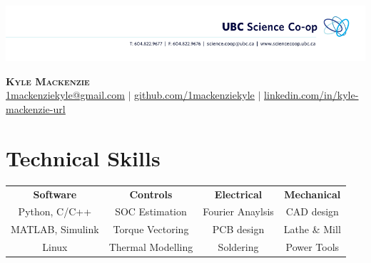 \documentclass[letterpaper,11pt]{article}
\begin{document}

\begin{center}
\vspace*{-1.5cm}
    \centerline{\includegraphics[width=\paperwidth]{head}}
    \textbf{\Huge \scshape Kyle Mackenzie} \\ \vspace{1pt}
    \href{mailto:1mackenziekyle@gmail.com}{\underline{1mackenziekyle@gmail.com}} $|$
    \small \href{https://github.com/1mackenziekyle}{\underline{github.com/1mackenziekyle}} $|$
    \href{https://www.linkedin.com/in/kyle-mackenzie-url/}{\underline{linkedin.com/in/kyle-mackenzie-url}}  
    
    
\end{center}

 
  
%
\section{Technical Skills}
\begin{center}
    \begin{tabular*}{\textwidth}{@{\extracolsep{\fill}}cccc}
        \textbf{Software} & \textbf{Controls} & \textbf{Electrical} & \textbf{Mechanical} \\
        Python, C/C++ & SOC Estimation & Fourier Anaylsis & CAD design \\
        MATLAB, Simulink & Torque Vectoring & PCB design & Lathe \& Mill \\
        Linux & Thermal Modelling & Soldering & Power Tools \\
    \end{tabular*}
\end{center}
\end{document}
